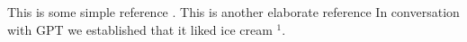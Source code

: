 \documentclass[aps,rmp,reprint,amsmath,amssymb,graphicx,longbibliography]{revtex4-1}
\begin{document}
This is some simple reference \cite{Goodfellow2016}.
This is another elaborate reference \cite{Hastie,raschka2022}
In conversation with GPT we established that it liked ice cream $^1$.

\begin{comment}
    \section{Template: Artificial Intelligence and Machine Learning for nuclear physics in broad strokes}
    
    
     Statistics, data science, and AI/ML form important fields of research
     in modern science. They describe how to learn and make predictions
     from data, and enable the extraction of key information about
     physical processes and the underlying scientific laws based on large
     datasets. As such, recent advances in AI capabilities are being
     applied to advance scientific discoveries in the physical sciences.




Ideally, AI represents the science of building models to perform a
task without being explicitly programmed. ML tasks fall under the
broader AI umbrella. We will henceforth refer to the methods discussed
as ``AI/ML''. The idea is that there exist generic algorithms which
can be used to find patterns in a broad class of datasets without
having to write code specifically for each problem. The algorithm
builds its own logic based on the data. The attentive reader should
however always keep in mind that machines and algorithms are to a
large extent developed by humans. The choice of a specific AI/ML
algorithm is governed by the insights and knowledge about a specific
system.



There exist many AI/ML approaches; they are often split into two main
categories, supervised and unsupervised. In supervised learning, data
are labeled and one lets a specific ML algorithm learn and deduce
patterns in the datasets. This allows one to make predictions about
future events and/or data not included in the training set.  On the
other hand, unsupervised learning is a method for finding patterns and
relationship in datasets without any prior knowledge of the
system. Many researchers also operate with a third category, dubbed
reinforcement learning. This is a paradigm of learning inspired by
behavioral psychology, where actions are learned to maximize reward.
One may encounter reinforcement learning being accompanied by
supervised deep learning methods. Furthermore, what is often referred
to as semi-supervised learning, entails developing algorithms that aim
at learning from a dataset that includes both labeled and unlabeled
data.



\end{comment}
\end{document}
